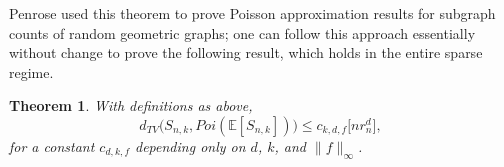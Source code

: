 \documentclass{amsart}
\newtheorem{thm}{Theorem}[section]
\theoremstyle{definition}
\newcommand{\E}{\mathbb{E}}
\renewcommand{\1}{\mathbb{1}}
\begin{document}
Penrose \cite{penrose} used this theorem to prove Poisson approximation
results for subgraph counts of random geometric graphs; one can follow
this approach essentially without change to prove the following
result, which holds in the entire sparse regime. 


\begin{thm}\label{Poisson-bd}
With definitions as above, 
$$d_{TV}\big(S_{n,k},Poi(\E[S_{n,k}])\big)\le c_{k,d,f}\big[nr_n^d\big],$$
for a constant $c_{d,k,f}$ depending only on $d$, $k$, and $\|f\|_\infty$.
\end{thm}

\begin{comment}
\begin{proof}[Proof of Theorem \ref{Poisson-bd}]
Recall that $S_{n,k}=\sum_{{\bf i}\in I}\xi_{\bf i},$ with 
$$I=\{{\bf i}=(i_1, \ldots,i_k):1\le i_1<i_2< \cdots<i_k\le
n\}$$ and $\xi_{\bf i}$ the indicator that the i.i.d.  points
$X_{i_1},\ldots,X_{i_k}$ form an empty $( k-1)$-simplex
with respect to $r_n$.  Observe that if
$\{i_1,\ldots,i_k\}\cap\{j_1,\ldots,j_k\}=\emptyset$, then the
corresponding random variables $\xi_{(i_1,\ldots,i_k)}$ and
$\xi_{(i_1, \ldots,i_k)}$ are independent, thus the dependency
relation $\sim$ can be taken to be
$(i_1,\ldots,i_k)\sim(j_1,\ldots,j_k)$ if and only if
$\{i_1,\ldots,i_k\}\cap\{j_1,\ldots,j_k\}\neq\emptyset.$


\end{comment}
\end{document}

